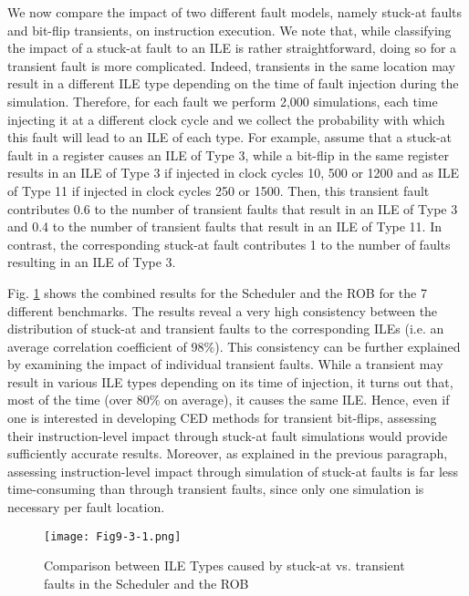 \documentclass[12pt]{yalephd}
\newcommand{\snp}[1] {\noindent {\underline {#1}}}
\begin{document}
\snp{Transient fault classification:} We now compare the impact of two different fault models, namely stuck-at faults and bit-flip transients, on instruction execution. We note that, while classifying the impact of a stuck-at fault to an ILE is rather straightforward, doing so for a transient fault is more complicated. Indeed, transients in the same location may result in a different ILE type depending on the time of fault injection during the simulation. Therefore, for each fault we perform 2,000 simulations, each time injecting it at a different clock cycle and we collect the probability with which this fault will lead to an ILE of each type. For example, assume that a stuck-at fault in a register causes an ILE of Type 3, while a bit-flip in the same register results in an ILE of Type 3 if injected in clock cycles 10, 500 or 1200 and as ILE of Type 11 if injected in clock cycles 250 or 1500. Then, this transient fault contributes 0.6 to the number of transient faults that result in an ILE of Type 3 and 0.4 to the number of transient faults that result in an ILE of Type 11. In contrast, the corresponding stuck-at fault contributes 1 to the number of faults resulting in an ILE of Type 3.

\snp{Impact consistency:} Fig. \ref{sC2Stuck-Trans} shows the combined results for the Scheduler and the ROB for the 7 different benchmarks. The results reveal a very high consistency between the distribution of stuck-at and transient faults to the corresponding ILEs (i.e. an average correlation coefficient of 98\%). This consistency can be further explained by examining the impact of individual transient faults. While a transient may result in various ILE types depending on its time of injection, it turns out that, most of the time (over 80\% on average), it causes the same ILE. Hence, even if one is interested in developing CED methods for transient bit-flips, assessing their instruction-level impact through stuck-at fault simulations would provide sufficiently accurate results. Moreover, as explained in the previous paragraph, assessing instruction-level impact through simulation of stuck-at faults is far less time-consuming than through transient faults, since only one simulation is necessary per fault location.

\begin{figure}[!ht]
\centering
\texttt{[image: Fig9-3-1.png]}
\caption{Comparison between ILE Types caused by stuck-at vs. transient faults in the Scheduler and the ROB}
\label{sC2Stuck-Trans}
\end{figure}
\end{document}

